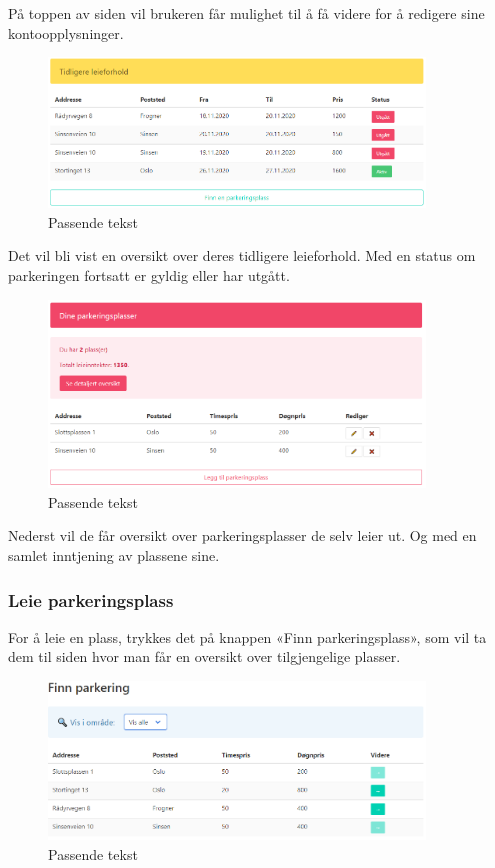 På toppen av siden vil brukeren får mulighet til å få videre for å redigere sine kontoopplysninger.

\begin{figure}[H]
    \centering
    \includegraphics[width=10cm]{bilder/Eksempler/tidligere_leide_plasser.png}
    \caption{Passende tekst}
    \label{fig:eks:profile_leide}
\end{figure}

Det vil bli vist en oversikt over deres tidligere leieforhold. Med en status om parkeringen fortsatt er gyldig eller har utgått.

\begin{figure}[H]
    \centering
    \includegraphics[width=10cm]{bilder/Eksempler/dine_plasser.png}
    \caption{Passende tekst}
    \label{fig:eks:profile_spots}
\end{figure}

Nederst vil de får oversikt over parkeringsplasser de selv leier ut. Og med en samlet inntjening av plassene sine.

\subsubsection{Leie parkeringsplass}
For å leie en plass, trykkes det på knappen «Finn parkeringsplass», som vil ta dem til siden hvor man får en oversikt over tilgjengelige plasser.

\begin{figure}[H]
    \centering
    \includegraphics[width=10cm]{bilder/Eksempler/finnparkering.png}
    \caption{Passende tekst}
    \label{fig:eks:findspots}
\end{figure}

